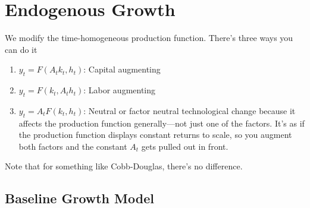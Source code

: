\documentclass[12pt]{article}
\theoremstyle{plain}
\theoremstyle{definition}
\theoremstyle{remark}
\begin{document}
\clearpage
\section{Endogenous Growth}

We modify the time-homogeneous production function. There's three ways
you can do it
\begin{enumerate}
  \item $y_t = F(A_t k_t,h_t)$: Capital augmenting
  \item $y_t = F(k_t,A_t h_t)$: Labor augmenting
  \item $y_t = A_t F(k_t,h_t)$: Neutral or factor neutral technological
    change because it affects the production function generally---not
    just one of the factors. It's as if the production function displays
    constant returns to scale, so you augment both factors and the
    constant $A_t$ gets pulled out in front.
\end{enumerate}
Note that for something like Cobb-Douglas, there's no difference.

\subsection{Baseline Growth Model}
\end{document}
